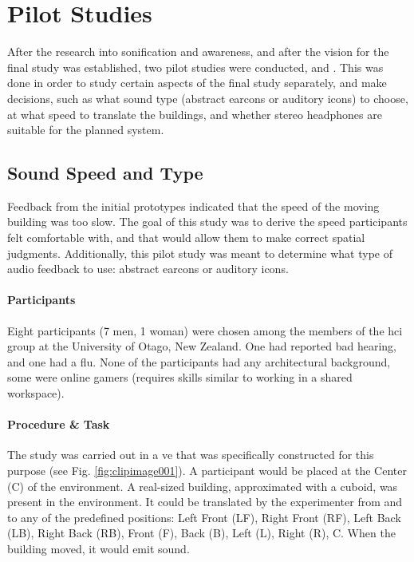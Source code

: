\section{Pilot Studies}
After the research into sonification and awareness, and after the vision for the final  study was established, two pilot studies were conducted,  and . This was done in order to study certain aspects of the final study separately, and make decisions, such as what sound type (abstract earcons or auditory icons) to choose, at what speed to translate the buildings, and whether stereo headphones are suitable for the planned system.

\subsection{Sound Speed and Type}
\label{study_one}
Feedback from the initial prototypes indicated that the speed of the moving building was too slow. The goal of this study was to derive the speed participants felt comfortable with, and that would allow them to make correct spatial judgments. Additionally, this pilot study was meant to determine what type of audio feedback to use: abstract earcons or auditory icons.

\paragraph{Participants}
Eight participants (7 men, 1 woman) were chosen among the members of the \gls{hci} group at the University of Otago, New Zealand. One had reported bad hearing, and one had a flu.  None of the participants had any architectural background, some were online gamers (requires skills similar to working in a shared workspace).

\paragraph{Procedure \& Task}
The study was carried out in a \gls{ve} that was specifically constructed for this purpose (see Fig. \ref{fig:clipimage001}). A participant would be placed at the Center (C) of the environment. A real-sized building, approximated with a cuboid, was present in the environment. It could be translated by the experimenter from and to any of the predefined positions: Left Front (LF), Right Front (RF), Left Back (LB), Right Back (RB), Front (F), Back (B), Left (L), Right (R), C. When the building moved, it would emit sound.

